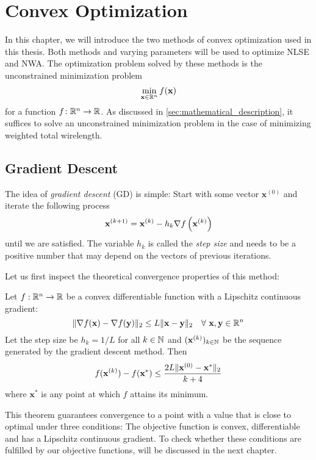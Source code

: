 \chapter{Convex Optimization} \label{chap:convex_optimization}

In this chapter, we will introduce the two methods of convex optimization used in this thesis.
Both methods and varying parameters will be used to optimize NLSE and NWA.
The optimization problem solved by these methods is the unconstrained minimization problem
\[ \min_{\mathbf{x} \in \mathbb{R}^n} f(\mathbf{x}) \]
for a function \(f \colon \mathbb{R}^n \to \mathbb{R}\).
As discussed in \cref{sec:mathematical_description}, it suffices to solve an unconstrained minimization problem
in the case of minimizing weighted total wirelength.



\section{Gradient Descent} \label{sec:gradient_descent}

The idea of \emph{gradient descent} (GD) is simple:
Start with some vector \(\mathbf{x}^{(0)}\) and iterate the following process
\[ \mathbf{x}^{(k+1)} = \mathbf{x}^{(k)} - h_k \nabla f \left({ \mathbf{x}^{(k)} }\right) \]
until we are satisfied. 
The variable \(h_k\) is called the \emph{step size} and needs to be a positive number that may depend on the vectors of previous iterations.

Let us first inspect the theoretical convergence properties of this method:
\begin{theorem} \label{thm:gradient_descent_converges}
 Let \(f: \mathbb{R}^n \to \mathbb{R}\) be a convex differentiable function with a Lipschitz continuous gradient:
 \[ \lVert \nabla f(\mathbf{x}) - \nabla f(\mathbf{y}) \rVert_2 \leq L \lVert\mathbf{x} - \mathbf{y}\rVert_2 \quad \forall \ \mathbf{x}, \mathbf{y} \in \mathbb{R}^n\]
 Let the step size be \(h_k = 1/L\) for all \(k \in \mathbb{N}\) 
 and \((\mathbf{x}^{(k)})_{k \in \mathbb{N}}\) be the sequence generated by the gradient descent method.
 Then
 \[ f(\mathbf{x}^{(k)}) - f(\mathbf{x}^*) \leq \frac{2 L \lVert\mathbf{x}^{(0)} - \mathbf{x}^*\rVert_2}{k + 4} \]
 where \(\mathbf{x}^*\) is any point at which \(f\) attains its minimum.
\end{theorem}

This theorem guarantees convergence to a point with a value that is close to optimal under three conditions:
The objective function is convex, differentiable and has a Lipschitz continuous gradient.
To check whether these conditions are fulfilled by our objective functions, will be discussed in the next chapter.

